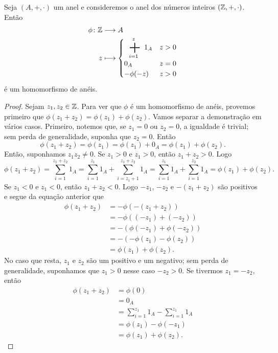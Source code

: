 \begin{example}
	Seja $(A,+,\cdot)$ um anel e consideremos o anel dos números inteiros $(\mathbb{Z},+,\cdot)$. Então
	\begin{align*}
	\func{\phi}{\Z}{A}{z}{\begin{cases}
					\displaystyle \sum_{i=1}^z 1_A & z>0 \\
					0_A & z=0 \\
					-\phi(-z) & z>0
					\end{cases}}
	\end{align*}
é um homomorfismo de anéis.
\end{example}
\begin{proof}
	Sejam $z_1,z_2 \in \mathbb{Z}$. Para ver que $\phi$ é um homomorfismo de anéis, provemos primeiro que $\phi(z_1+z_2)=\phi(z_1)+\phi(z_2)$. Vamos separar a demonstração em vários casos. Primeiro, notemos que, se $z_1=0$ ou $z_2=0$, a igualdade é trivial; sem perda de generalidade, suponha que $z_2=0$. Então
	\begin{equation*}
	\phi(z_1+z_2) = \phi(z_1) = \phi(z_1) + 0_A = \phi(z_1) + \phi(z_2).
	\end{equation*}
Então, suponhamos $z_1z_2 \neq 0$. Se $z_1>0$ e $z_1>0$, então $z_1+z_2>0$. Logo
	\begin{equation*}
	\phi(z_1+z_2) = \sum_{i=1}^{z_1+z_2} 1_A = \sum_{i=1}^{z_1} 1_A + \sum_{i=z_1+1}^{z_1+z_2} 1_A = \sum_{i=1}^{z_1} 1_A + \sum_{i=1}^{z_2} 1_A = \phi(z_1)+\phi(z_2).
	\end{equation*}
Se $z_1<0$ e $z_1<0$, então $z_1+z_2<0$. Logo $-z_1$, $-z_2$ e $-(z_1+z_2)$ são positivos e segue da equação anterior que
	\begin{align*}
	\phi(z_1+z_2) &= -\phi(-(z_1+z_2)) \\
		&= -\phi((-z_1)+(-z_2)) \\
		&= -(\phi(-z_1)+\phi(-z_2)) \\
		&= -(-\phi(z_1)-\phi(z_2)) \\
		&= \phi(z_1)+\phi(z_2).
	\end{align*}
No caso que resta, $z_1$ e $z_2$ são um positivo e um negativo; sem perda de generalidade, suponhamos que $z_1>0$ nesse caso $-z_2>0$. Se tivermos $z_1=-z_2$, então
	\begin{align*}
	\phi(z_1+z_2) &= \phi(0) \\
		&= 0_A \\
		&= \sum_{i=1}^{z_1} 1_A - \sum_{i=1}^{z_1} 1_A \\
		&= \phi(z_1)-\phi(-z_1) \\
		&= \phi(z_1)+\phi(z_2).

\end{align*}
\end{proof}
